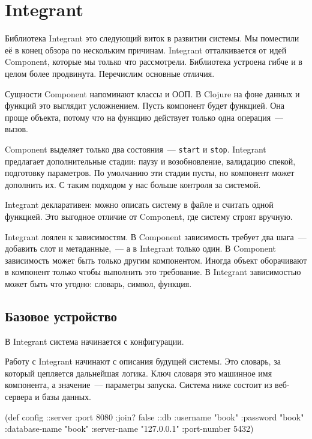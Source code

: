\section{Integrant}


Библиотека Integrant это
следующий виток в развитии системы. Мы поместили её в конец обзора по нескольким
причинам. Integrant отталкивается от идей Component, которые мы только что
рассмотрели. Библиотека устроена гибче и в целом более продвинута. Перечислим
основные отличия.


Сущности Component напоминают классы и ООП. В Clojure на фоне данных и функций
это выглядит усложнением. Пусть компонент будет функцией. Она проще объекта,
потому что на функцию действует только одна операция~--- вызов.

Component выделяет только два состояния~--- \verb|start| и
\verb|stop|. Integrant предлагает дополнительные стадии: паузу и
возобновление, валидацию спекой, подготовку параметров. По умолчанию эти стадии
пусты, но компонент может дополнить их. С таким подходом у нас больше контроля
за системой.


Integrant декларативен: можно описать систему в файле и считать одной
функцией. Это выгодное отличие от Component, где систему строят вручную.

Integrant лоялен к зависимостям. В Component зависимость требует два шага~---
добавить слот и метаданные,~--- а в Integrant только один. В Component
зависимость может быть только другим компонентом. Иногда объект оборачивают в
компонент только чтобы выполнить это требование. В Integrant зависимостью может
быть что угодно: словарь, символ, функция.

\subsection{Базовое устройство}

В Integrant система начинается с конфигурации.

Работу с Integrant начинают с описания будущей системы. Это словарь, за который
цепляется дальнейшая логика. Ключ словаря это машинное имя компонента, а
значение~--- параметры запуска. Система ниже состоит из веб-сервера и базы
данных.

\begin{english}
  \begin{clojure}
(def config
  {::server {:port 8080 :join? false}
   ::db {:username      "book"
         :password      "book"
         :database-name "book"
         :server-name   "127.0.0.1"
         :port-number   5432}})
  \end{clojure}
\end{english}

